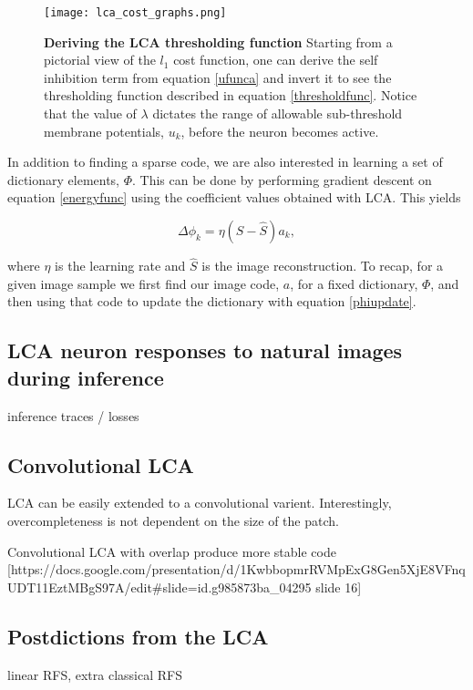 \begin{figure}[ht]\label{lca_thresh}
\centering %
\texttt{[image: lca\_cost\_graphs.png]}
\caption{\textbf{Deriving the LCA thresholding function} Starting from a pictorial view of the $l_{1}$ cost function, one can derive the self inhibition term from equation \eqref{ufunca} and invert it to see the thresholding function described in equation \eqref{thresholdfunc}. Notice that the value of $\lambda$ dictates the range of allowable sub-threshold membrane potentials, $u_{k}$, before the neuron becomes active.}
\end{figure}

In addition to finding a sparse code, we are also interested in learning a set of dictionary elements, $\Phi$. This can be done by performing gradient descent on equation \eqref{energyfunc} using the coefficient values obtained with LCA. This yields

\begin{equation}
  \Delta \phi_{k} = \eta (S - \hat{S}) a_{k},
\label{phiupdate}
\end{equation}

\noindent where $\eta$ is the learning rate and $\hat{S}$ is the image reconstruction. To recap, for a given image sample we first find our image code, $a$, for a fixed dictionary, $\Phi$, and then using that code to update the dictionary with equation \eqref{phiupdate}.


\subsection{LCA neuron responses to natural images during inference}
inference traces / losses


\subsection{Convolutional LCA}

LCA can be easily extended to a convolutional varient. Interestingly, overcompleteness is not dependent on the size of the patch.

Convolutional LCA with overlap produce more stable code [https://docs.google.com/presentation/d/1KwbbopmrRVMpExG8Gen5XjE8VFnqUDT11EztMBgS97A/edit#slide=id.g985873ba_04295 slide 16]


\subsection{Postdictions from the LCA}
linear RFS, extra classical RFS



